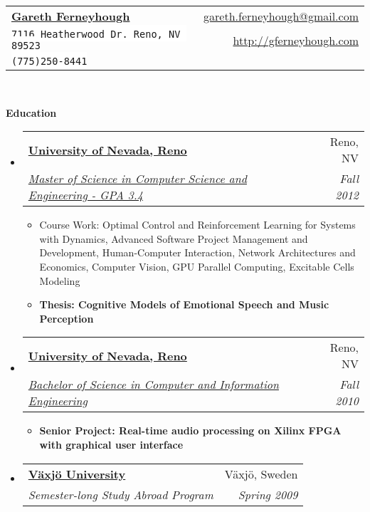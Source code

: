 \documentclass[letterpaper,11pt]{article}
\makeatletter
\newcommand{\resitem}[1]{\item #1 \vspace{-2pt}}
\newcommand{\resheading}[1]{{\large \colorbox{mygrey}{\begin{minipage}{\textwidth}{\textbf{#1 \vphantom{p\^{E}}}}\end{minipage}}}}
\newcommand{\ressubheading}[4]{
\begin{tabular*}{6.5in}{l@{\extracolsep{\fill}}r}
		\textbf{#1} & #2 \\
		\textit{#3} & \textit{#4} \\
\end{tabular*}\vspace{-6pt}}
\makeatother
\begin{document}
\newcommand{\mywebheader}{
\begin{tabular*}{7in}{l@{\extracolsep{\fill}}r}
	\textbf{\href{http://gferneyhough.com/}{\LARGE Gareth Ferneyhough}} & \href{mailto:gareth.ferneyhough@gmail.com}{gareth.ferneyhough@gmail.com}\\
	{\footnotesize \texttt{\colorbox{white}{7116 Heatherwood Dr. Reno, NV 89523}}} & \href{http://gferneyhough.com}{http://gferneyhough.com} \\
	{\footnotesize \texttt{\colorbox{white}{(775)250-8441}}}
	\end{tabular*}
\\
\vspace{0.1in}}

\mywebheader

\resheading{Education}
	\begin{itemize}
		\item
			\ressubheading{\href{http://www.unr.edu/}{University of Nevada, Reno}}{Reno, NV}{\href{http://www.cse.unr.edu/academics/graduate/cesms.html}{Master of Science in Computer Science and Engineering - GPA 3.4}}{Fall 2012}
				{ \footnotesize
				\begin{itemize}
				  \resitem{Course Work: Optimal Control and Reinforcement Learning for Systems with Dynamics, Advanced Software Project Management and Development, Human-Computer Interaction, Network Architectures and Economics, Computer Vision, GPU Parallel Computing, Excitable Cells Modeling}  
				  \resitem{\textbf{Thesis: Cognitive Models of Emotional Speech and Music Perception}}
				\end{itemize}
				}
		\item
			\ressubheading{\href{http://www.unr.edu/}{University of Nevada, Reno}}{Reno, NV}{\href{http://www.cse.unr.edu/academics/undergraduate/ciebs.html}{Bachelor of Science in Computer and Information Engineering}}{Fall 2010}
				{ \footnotesize
				\begin{itemize}
				  \resitem{\textbf{Senior Project: Real-time audio processing on Xilinx FPGA with graphical user interface}}
				\end{itemize}
				}
		\item
			\ressubheading{\href{http://lnu.se/?l=en}{V\"{a}xj\"{o} University}}{V\"{a}xj\"{o}, Sweden}{Semester-long Study Abroad Program}{Spring 2009}
	\end{itemize} %
\end{document}
